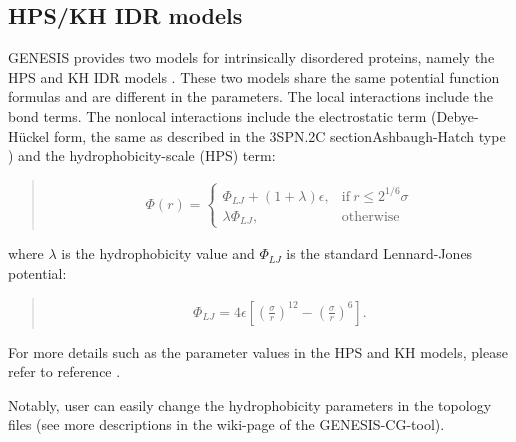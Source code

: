 \documentclass[a4paper,11pt,oneside,english]{sphinxmanual}
\begin{document}
\subsection{HPS/KH IDR models}
\label{\detokenize{05_Energy:hps-kh-idr-models}}
GENESIS provides two models for intrinsically disordered proteins, namely the
HPS and KH IDR models .  These two models share the same
potential function formulas and are different in the parameters.  The local
interactions include the bond terms.  The nonlocal interactions include the
electrostatic term (Debye-Hückel form, the same as described in the 3SPN.2C
sectionAshbaugh-Hatch type ) and the hydrophobicity-scale (HPS) term:
\begin{quote}

\vspace{-5mm}
\begin{equation*}
\begin{split}\Phi(r) = \begin{cases} \Phi_{LJ} + (1+\lambda)\epsilon, & \mathrm{if}\ r \le 2^{1/6}\sigma \\ \lambda \Phi_{LJ}, & \mathrm{otherwise} \end{cases}\end{split}
\end{equation*}
\vspace{-3mm}
\end{quote}

where \(\lambda\) is the hydrophobicity value and \(\Phi_{LJ}\) is the standard Lennard-Jones potential:
\begin{quote}

\vspace{-5mm}
\begin{equation*}
\begin{split}\Phi_{LJ} =  4\epsilon \left[  \left(\frac{\sigma}{r}\right)^{12} - \left(\frac{\sigma}{r}\right)^6    \right].\end{split}
\end{equation*}
\vspace{-3mm}
\end{quote}

For more details such as the parameter values in the HPS and KH models, please refer to reference .

Notably, user can easily change the hydrophobicity parameters in the topology
files (see more descriptions in the wiki-page of the GENESIS-CG-tool).
\end{document}
